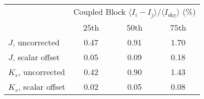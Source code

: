 \begin{tabular}{lccc}
& \multicolumn{3}{c}{Coupled Block
$\langle I_i - I_j\rangle / \langle I_\mathrm{sky} \rangle$ (\%)} \\
& 25th & 50th & 75th \\
\hline
$J$, uncorrected & 0.47 & 0.91 & 1.70 \\
$J$, scalar offset & 0.05 & 0.09 & 0.18 \\
\hline
$K_s$, uncorrected & 0.42 & 0.90 & 1.43 \\
$K_s$, scalar offset & 0.02 & 0.05 & 0.08 \\
\hline
\end{tabular}